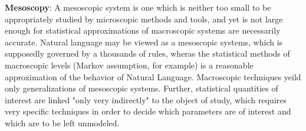 \documentclass{report}
\begin{document}
\textbf{Mesoscopy}: A mesoscopic system is one which is neither too small to be
appropriately studied by microscopic methods and tools, and yet is not large
enough for statistical approximations of macroscopic systems are necessarily
accurate. Natural language may be viewed as a mesoscopic systems, which is
supposedly governed by a thousands of rules, wheras the statistical methods of
macroscopic levels (Markov assumption, for example) is a reasonable
approximation of the behavior of Natural Language. Macroscopic techniques yeild
only generalizations of mesoscopic systems. Further, statistical quantities
of interest are linked "only very indirectly" to the object of study, which
requires very specific techniques in order to decide which parameters are of
interest and which are to be left unmodeled.
\end{document}
